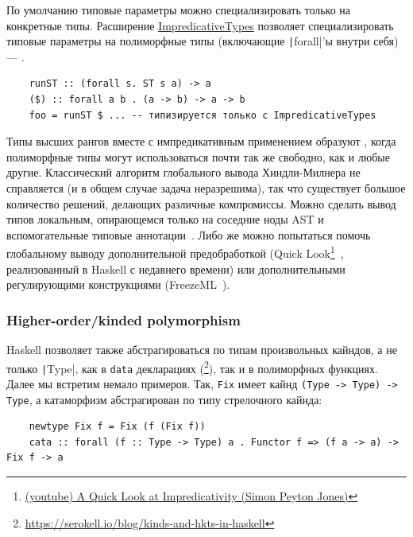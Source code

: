 По умолчанию типовые параметры можно специализировать только на конкретные типы.
Расширение \href{https://downloads.haskell.org/ghc/latest/docs/users_guide/exts/impredicative_types.html}{ImpredicativeTypes} позволяет специализировать типовые параметры на полиморфные типы (включающие \texttt|forall|'ы внутри себя) --- .
\begin{verbatim}
    runST :: (forall s. ST s a) -> a
    ($) :: forall a b . (a -> b) -> a -> b
    foo = runST $ ... -- типизируется только с ImpredicativeTypes
\end{verbatim}

Типы высших рангов вместе с импредикативным применением образуют , когда полиморфные типы могут использоваться почти так же свободно, как и любые другие.
Классический алгоритм глобального вывода Хиндли-Милнера не справляется (и в общем случае задача неразрешима), так что существует большое количество решений, делающих различные компромиссы.
Можно сделать вывод типов локальным, опирающемся только на соседние ноды AST и вспомогательные типовые аннотации~\cite{pierce2000local, christiansen2013bidirectional, dunfield2019sound}.
Либо же можно попытаться помочь глобальному выводу дополнительной предобработкой (Quick Look\footnote{\href{https://youtu.be/ZuNMo136QqI?si=qp8PAEeeF-bioCB_}{(youtube) A Quick Look at Impredicativity (Simon Peyton Jones)}}~\cite{serrano2020quick}, реализованный в Haskell с недавнего времени) или дополнительными регулирующими конструкциями (FreezeML~\cite{emrich2020freezeml}).


\subsubsection{Higher-order/kinded polymorphism}

Haskell позволяет также абстрагироваться по типам произвольных кайндов, а не только \texttt|Type|, как в \texttt{data} декларациях (\footnote{\url{https://serokell.io/blog/kinds-and-hkts-in-haskell}}), так и в полиморфных функциях.
Далее мы встретим немало примеров.
Так, \texttt{Fix} имеет кайнд \texttt{(Type -> Type) -> Type}, а катаморфизм абстрагирован по типу стрелочного кайнда:
\begin{verbatim}
    newtype Fix f = Fix (f (Fix f))
    cata :: forall (f :: Type -> Type) a . Functor f => (f a -> a) -> Fix f -> a
\end{verbatim}

